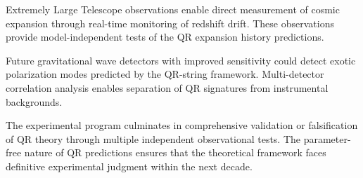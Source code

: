 Extremely Large Telescope observations enable direct measurement of cosmic expansion through real-time monitoring of redshift drift. These observations provide model-independent tests of the QR expansion history predictions.

Future gravitational wave detectors with improved sensitivity could detect exotic polarization modes predicted by the QR-string framework. Multi-detector correlation analysis enables separation of QR signatures from instrumental backgrounds.

The experimental program culminates in comprehensive validation or falsification of QR theory through multiple independent observational tests. The parameter-free nature of QR predictions ensures that the theoretical framework faces definitive experimental judgment within the next decade.